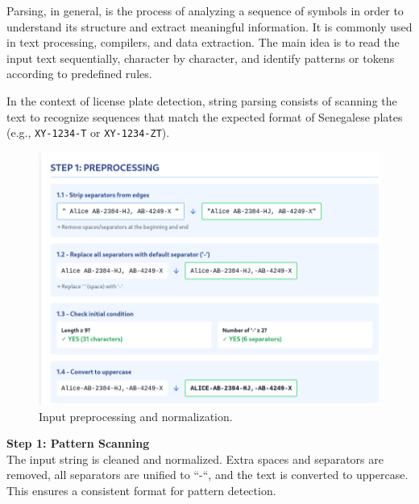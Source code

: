 \documentclass[12pt,a4paper]{article}
\begin{document}
Parsing, in general, is the process of analyzing a sequence of symbols in order to understand its structure 
and extract meaningful information. It is commonly used in text processing, compilers, and data extraction. 
The main idea is to read the input text sequentially, character by character, and identify patterns or tokens 
according to predefined rules.

In the context of license plate detection, string parsing consists of scanning the text to recognize sequences 
that match the expected format of Senegalese plates (e.g., \texttt{XY-1234-T} or \texttt{XY-1234-ZT}). 




\begin{figure}[H]
    \centering
    \includegraphics[width=\linewidth]{AIMS_Senegal__Assignment_template/step1Parsing.png}
    \caption{Input preprocessing and normalization.}
    \label{fig:step1Parsing}

\end{figure}

\textbf{Step 1: Pattern Scanning} \\
The input string is cleaned and normalized. Extra spaces and separators are removed, all separators are unified to ``-``, and the text is converted to uppercase. This ensures a consistent format for pattern detection.
\end{document}
